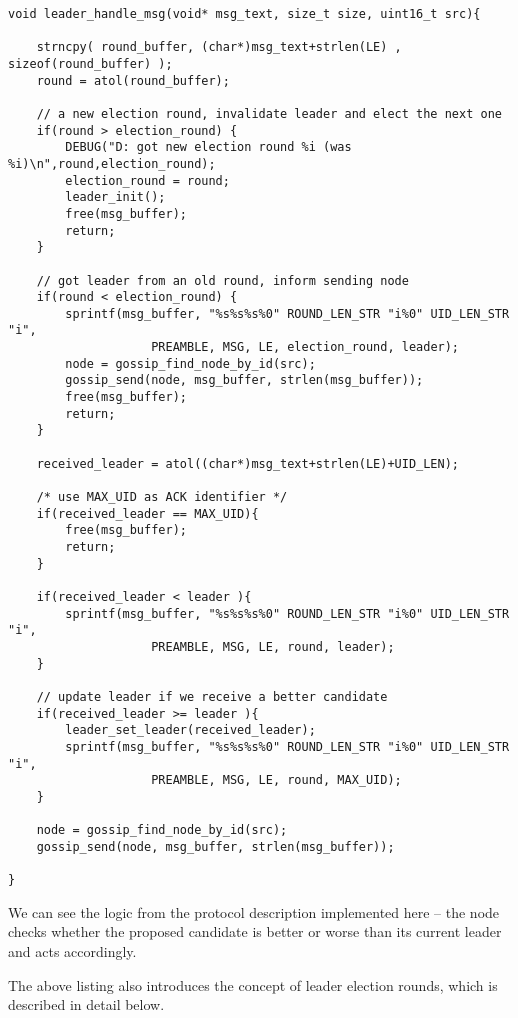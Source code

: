 \documentclass[11pt,
  a4paper,
  ngerman,
  BCOR=7mm
]{scrartcl}
\begin{document}
\begin{lstlisting}
void leader_handle_msg(void* msg_text, size_t size, uint16_t src){

    strncpy( round_buffer, (char*)msg_text+strlen(LE) , sizeof(round_buffer) );
    round = atol(round_buffer);

    // a new election round, invalidate leader and elect the next one
    if(round > election_round) {
        DEBUG("D: got new election round %i (was %i)\n",round,election_round);
        election_round = round;
        leader_init();
        free(msg_buffer);
        return;
    }

    // got leader from an old round, inform sending node
    if(round < election_round) {
        sprintf(msg_buffer, "%s%s%s%0" ROUND_LEN_STR "i%0" UID_LEN_STR "i",
                    PREAMBLE, MSG, LE, election_round, leader);
        node = gossip_find_node_by_id(src);
        gossip_send(node, msg_buffer, strlen(msg_buffer));
        free(msg_buffer);
        return;
    }

    received_leader = atol((char*)msg_text+strlen(LE)+UID_LEN);

    /* use MAX_UID as ACK identifier */
    if(received_leader == MAX_UID){
        free(msg_buffer);
        return;
    }

    if(received_leader < leader ){
        sprintf(msg_buffer, "%s%s%s%0" ROUND_LEN_STR "i%0" UID_LEN_STR "i",
                    PREAMBLE, MSG, LE, round, leader);
    }

    // update leader if we receive a better candidate
    if(received_leader >= leader ){
        leader_set_leader(received_leader);
        sprintf(msg_buffer, "%s%s%s%0" ROUND_LEN_STR "i%0" UID_LEN_STR "i",
                    PREAMBLE, MSG, LE, round, MAX_UID);
    }

    node = gossip_find_node_by_id(src);
    gossip_send(node, msg_buffer, strlen(msg_buffer));

}
\end{lstlisting}

We can see the logic from the protocol description implemented here --
the node checks whether the proposed candidate is better or worse than
its current leader and acts accordingly.

The above listing also introduces the concept of leader election rounds,
which is described in detail below.
\end{document}

